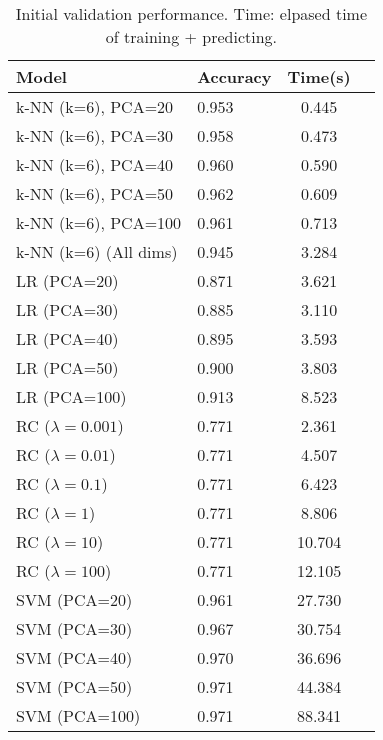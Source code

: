 \begin{table}
\centering
\caption{Initial validation performance. Time: elpased time of training + predicting.}
\label{tab:validation}
\begin{tabular}{|l|l|c|c|}
\toprule
                            Model &  Accuracy &   Time(s) \\
\midrule
               k-NN (k=6), PCA=20 &     0.953 &  0.445 \\
               k-NN (k=6), PCA=30 &     0.958 &  0.473 \\
               k-NN (k=6), PCA=40 &     0.960 &  0.590 \\
               k-NN (k=6), PCA=50 &     0.962 &  0.609 \\
              k-NN (k=6), PCA=100 &     0.961 &  0.713 \\
            k-NN (k=6) (All dims) &     0.945 &  3.284 \\
     LR (PCA=20) &     0.871 &  3.621 \\
     LR (PCA=30) &     0.885 &  3.110 \\
     LR (PCA=40) &     0.895 &  3.593 \\
     LR (PCA=50) &     0.900 &  3.803 \\
    LR (PCA=100) &     0.913 &  8.523 \\
RC ($\lambda=0.001$) &     0.771 &  2.361 \\
 RC ($\lambda=0.01$) &     0.771 &  4.507 \\
  RC ($\lambda=0.1$) &     0.771 &  6.423 \\
    RC ($\lambda=1$) &     0.771 &  8.806 \\
   RC ($\lambda=10$) &     0.771 & 10.704 \\
  RC ($\lambda=100$) &     0.771 & 12.105 \\
                     SVM (PCA=20) &     0.961 & 27.730 \\
                     SVM (PCA=30) &     0.967 & 30.754 \\
                     SVM (PCA=40) &     0.970 & 36.696 \\
                     SVM (PCA=50) &     0.971 & 44.384 \\
                    SVM (PCA=100) &     0.971 & 88.341 \\
\bottomrule
\end{tabular}
\end{table}
